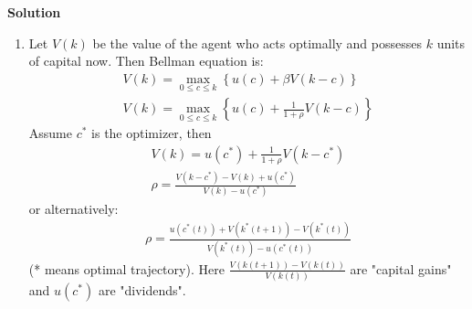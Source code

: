 \documentclass[a4paper]{article}
\begin{document}
\textbf{Solution}

\begin{enumerate}
	\item Let $V(k)$ be the value of the agent who acts optimally and possesses $k$ units of capital now. Then Bellman equation is:
	\begin{align*}
	V(k) = \underset{0 \le c \le k}{\max}\left\{u(c) + \beta V(k - c)\right\} \\
	V(k) = \underset{0 \le c \le k}{\max}\left\{u(c) + \frac{1}{1+\rho} V(k - c)\right\} 
	\end{align*}
	Assume $c^*$ is the optimizer, then
	\begin{align*}
	V(k) = u(c^*) + \frac{1}{1+\rho}V(k-c^*)\\
	\rho = \frac{V(k - c^*) - V(k) + u(c^*)}{V(k) - u(c^*)}
	\end{align*}
	or alternatively:
	\begin{align*}
	\rho = \frac{u(c^*(t)) + V(k^*(t+1)) - V(k^*(t))}{V(k^*(t)) - u(c^*(t))}
	\end{align*}
	(* means optimal trajectory).
	Here $\frac{V(k(t+1)) - V(k(t))}{V(k(t))}$ are "capital gains" and $u(c^*)$ are "dividends". 
	

\end{enumerate}
\end{document}
